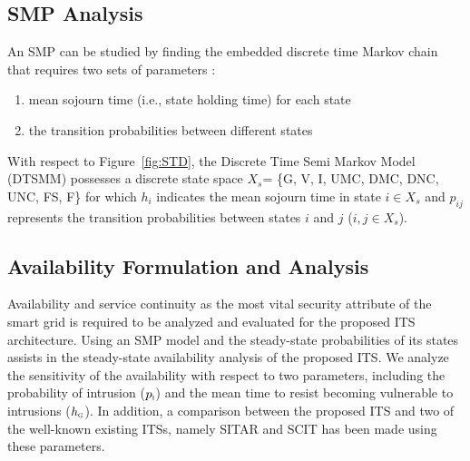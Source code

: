 \documentclass[preprint,number,12pt]{elsarticle}
\begin{document}
\subsection{SMP Analysis}
An SMP can be studied by finding the embedded discrete time Markov chain that requires two sets of parameters \citep{Madan2004167}\citep{Griffin2005c}:
\begin{enumerate}
\item mean sojourn time (i.e., state holding time) for each state
\item the transition probabilities between different states
\end{enumerate}
With respect to Figure~\ref{fig:STD}, the Discrete Time Semi Markov Model (DTSMM) possesses a discrete state space $X_s$= \{G, V, I, UMC, DMC, DNC, UNC, FS, F\} for which $h_i$ indicates the mean sojourn time in state $i \in X_s$ and $p_{ij}$ represents the transition probabilities between states $i$ and $j$ ($i, j \in X_s$).
\subsection {Availability Formulation and Analysis}
Availability and service continuity as the most vital security attribute of the smart grid is required to be analyzed and evaluated for the proposed ITS architecture. Using an SMP model and the steady-state probabilities of its states assists in the steady-state availability analysis of the proposed ITS. We analyze the sensitivity of the availability with respect to two parameters, including the probability of intrusion ($p_{\scalebox{0.5}{I}}$) and the mean time to resist becoming vulnerable to intrusions ($h_{\scalebox{0.5}{G}}$). In addition, a comparison between the proposed ITS and two of the well-known existing ITSs, namely SITAR and SCIT has been made using these parameters.
\end{document}
